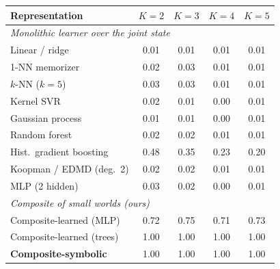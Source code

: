 \begin{tabular}{lcccc}
\toprule
Representation & $K{=}2$ & $K{=}3$ & $K{=}4$ & $K{=}5$ \\
\midrule
\multicolumn{5}{l}{\emph{Monolithic learner over the joint state}} \\
Linear / ridge & 0.01 & 0.01 & 0.01 & 0.01 \\
1-NN memorizer & 0.02 & 0.03 & 0.01 & 0.01 \\
$k$-NN ($k{=}5$) & 0.03 & 0.03 & 0.01 & 0.01 \\
Kernel SVR & 0.02 & 0.01 & 0.00 & 0.01 \\
Gaussian process & 0.01 & 0.01 & 0.00 & 0.01 \\
Random forest & 0.02 & 0.02 & 0.01 & 0.01 \\
Hist.\ gradient boosting & 0.48 & 0.35 & 0.23 & 0.20 \\
Koopman / EDMD (deg.\ 2) & 0.02 & 0.02 & 0.01 & 0.01 \\
MLP (2 hidden) & 0.03 & 0.02 & 0.00 & 0.01 \\
\midrule
\multicolumn{5}{l}{\emph{Composite of small worlds (ours)}} \\
Composite-learned (MLP) & 0.72 & 0.75 & 0.71 & 0.73 \\
Composite-learned (trees) & 1.00 & 1.00 & 1.00 & 1.00 \\
\textbf{Composite-symbolic} & 1.00 & 1.00 & 1.00 & 1.00 \\
\bottomrule
\end{tabular}
